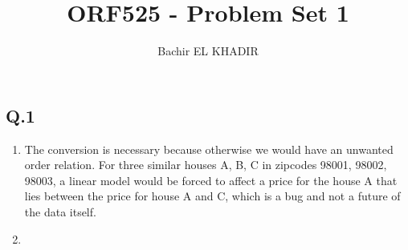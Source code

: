 \documentclass[12pt]{article}
\title{ORF525 - Problem Set 1}
\author{Bachir EL KHADIR }
\newcommand{\Q}[1]{\subsection*{Q.#1}}
\newenvironment{question}[1]
{\Q{#1}}{}
\begin{document}
\maketitle

\begin{question}{1}

  \begin{enumerate}
  \item The conversion is necessary because otherwise we would have an unwanted order relation. For three similar houses A, B, C in zipcodes 98001, 98002, 98003, a linear model would be forced to affect a price for the house A that lies between the price for house A and C, which is a bug and not a future of the data itself.


  \item 
  \end{enumerate}
\end{question}
\end{document}
